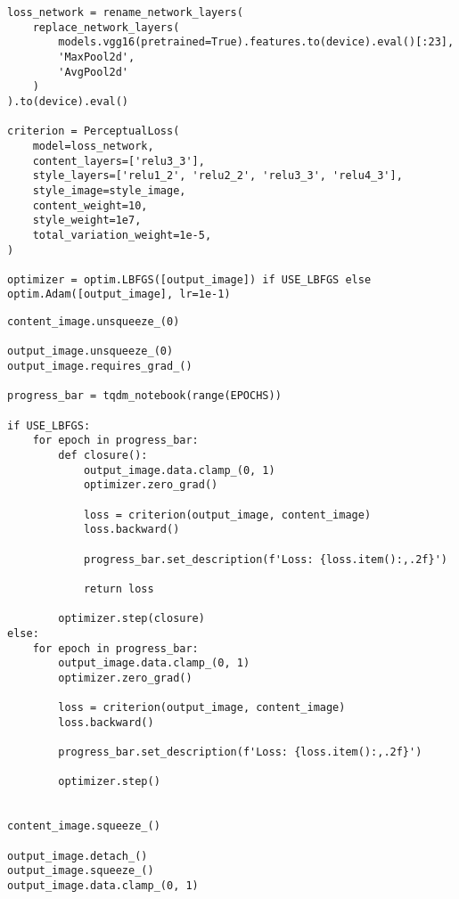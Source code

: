 \begin{listing}[ht]
\begin{verbatim}
loss_network = rename_network_layers(
    replace_network_layers(
        models.vgg16(pretrained=True).features.to(device).eval()[:23],
        'MaxPool2d',
        'AvgPool2d'
    )
).to(device).eval()

criterion = PerceptualLoss(
    model=loss_network,
    content_layers=['relu3_3'],
    style_layers=['relu1_2', 'relu2_2', 'relu3_3', 'relu4_3'],
    style_image=style_image,    
    content_weight=10,
    style_weight=1e7,
    total_variation_weight=1e-5,
)

optimizer = optim.LBFGS([output_image]) if USE_LBFGS else optim.Adam([output_image], lr=1e-1)
\end{verbatim}
\label{lst:neural_style_transfer_4}
\end{listing}

\pagebreak

\begin{listing}[ht]
\begin{verbatim}
content_image.unsqueeze_(0)

output_image.unsqueeze_(0)
output_image.requires_grad_()

progress_bar = tqdm_notebook(range(EPOCHS))

if USE_LBFGS:
    for epoch in progress_bar:
        def closure():
            output_image.data.clamp_(0, 1)
            optimizer.zero_grad()

            loss = criterion(output_image, content_image)
            loss.backward()

            progress_bar.set_description(f'Loss: {loss.item():,.2f}')

            return loss

        optimizer.step(closure)
else:
    for epoch in progress_bar:
        output_image.data.clamp_(0, 1)
        optimizer.zero_grad()

        loss = criterion(output_image, content_image)
        loss.backward()

        progress_bar.set_description(f'Loss: {loss.item():,.2f}')

        optimizer.step()


content_image.squeeze_()

output_image.detach_()
output_image.squeeze_()
output_image.data.clamp_(0, 1)
\end{verbatim}
\label{lst:neural_style_transfer_5}
\end{listing}

